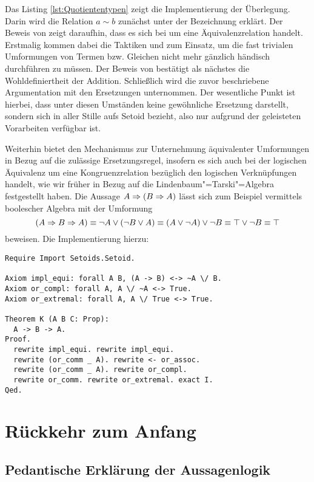 Das Listing \ref{lst:Quotiententypen} zeigt die Implementierung
der Überlegung. Darin wird die Relation $a\sim b$ zunächst unter
der Bezeichnung  erklärt. Der Beweis von 
zeigt daraufhin, dass es sich bei  um eine Äquivalenzrelation
handelt. Erstmalig kommen dabei die Taktiken  und
 zum Einsatz, um die fast trivialen Umformungen
von Termen bzw. Gleichen nicht mehr gänzlich händisch durchführen zu
müssen. Der Beweis von  bestätigt als nächstes die
Wohldefiniertheit der Addition. Schließlich wird die zuvor beschriebene
Argumentation mit den Ersetzungen unternommen. Der wesentliche Punkt ist
hierbei, dass  unter diesen Umständen keine gewöhnliche
Ersetzung darstellt, sondern sich in aller Stille aufs Setoid bezieht,
also nur aufgrund der geleisteten Vorarbeiten verfügbar ist.

Weiterhin bietet  den Mechanismus zur Unternehmung
äquivalenter Umformungen in Bezug auf die zulässige Ersetzungsregel,
insofern es sich auch bei der logischen Äquivalenz um eine
Kongruenzrelation bezüglich den logischen Verknüpfungen handelt, wie
wir früher in Bezug auf die Lindenbaum"=Tarski"=Algebra festgestellt haben.
Die Aussage $A\Rightarrow (B\Rightarrow A)$ lässt sich zum Beispiel vermittels
boolescher Algebra mit der Umformung
\[(A\Rightarrow B\Rightarrow A)\equiv \lnot A\lor (\lnot B\lor A)\equiv
(A\lor\lnot A)\lor\lnot B\equiv \top\lor\lnot B\equiv\top\]
beweisen. Die Implementierung hierzu:
\begin{lstlisting}[language=Coq, xleftmargin=\mathindent]
Require Import Setoids.Setoid.

Axiom impl_equi: forall A B, (A -> B) <-> ~A \/ B.
Axiom or_compl: forall A, A \/ ~A <-> True.
Axiom or_extremal: forall A, A \/ True <-> True.

Theorem K (A B C: Prop):
  A -> B -> A.
Proof.
  rewrite impl_equi. rewrite impl_equi.
  rewrite (or_comm _ A). rewrite <- or_assoc.
  rewrite (or_comm _ A). rewrite or_compl.
  rewrite or_comm. rewrite or_extremal. exact I.
Qed.
\end{lstlisting}

\newpage
\section{Rückkehr zum Anfang}

\subsection{Pedantische Erklärung der Aussagenlogik}

